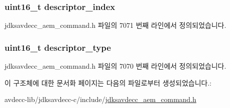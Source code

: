 \subsubsection[{\texorpdfstring{descriptor\+\_\+index}{descriptor_index}}]{\setlength{\rightskip}{0pt plus 5cm}uint16\+\_\+t descriptor\+\_\+index}\hypertarget{structjdksavdecc__aem__command__get__stream__format_a042bbc76d835b82d27c1932431ee38d4}{}\label{structjdksavdecc__aem__command__get__stream__format_a042bbc76d835b82d27c1932431ee38d4}


jdksavdecc\+\_\+aem\+\_\+command.\+h 파일의 7071 번째 라인에서 정의되었습니다.

\subsubsection[{\texorpdfstring{descriptor\+\_\+type}{descriptor_type}}]{\setlength{\rightskip}{0pt plus 5cm}uint16\+\_\+t descriptor\+\_\+type}\hypertarget{structjdksavdecc__aem__command__get__stream__format_ab7c32b6c7131c13d4ea3b7ee2f09b78d}{}\label{structjdksavdecc__aem__command__get__stream__format_ab7c32b6c7131c13d4ea3b7ee2f09b78d}


jdksavdecc\+\_\+aem\+\_\+command.\+h 파일의 7070 번째 라인에서 정의되었습니다.



이 구조체에 대한 문서화 페이지는 다음의 파일로부터 생성되었습니다.\+:\begin{DoxyCompactItemize}
\item 
avdecc-\/lib/jdksavdecc-\/c/include/\hyperlink{jdksavdecc__aem__command_8h}{jdksavdecc\+\_\+aem\+\_\+command.\+h}\end{DoxyCompactItemize}
